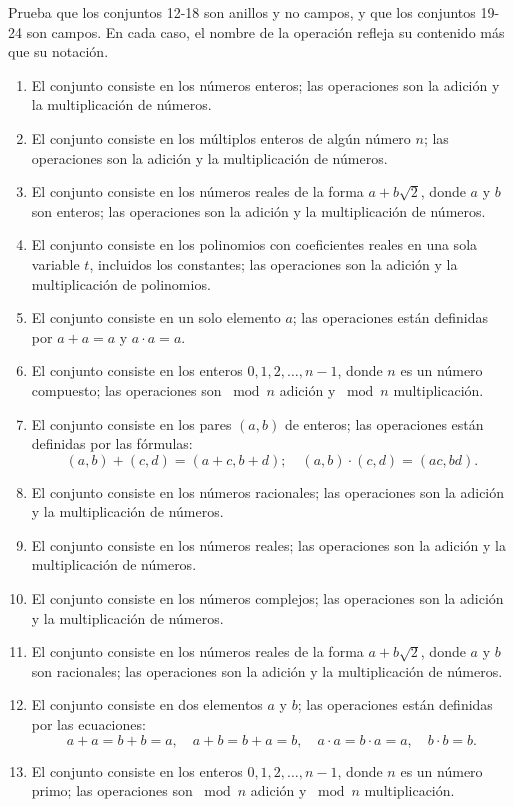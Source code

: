 Prueba que los conjuntos 12-18 son anillos y no campos, y que los conjuntos 19-24 son campos. En cada caso, el nombre de la operación refleja su contenido más que su notación.
\begin{enumerate}[resume]
    \item El conjunto consiste en los números enteros; las operaciones son la adición y la multiplicación de números.
    \item El conjunto consiste en los múltiplos enteros de algún número $n$; las operaciones son la adición y la multiplicación de números.
    \item El conjunto consiste en los números reales de la forma $a + b\sqrt{2}$, donde $a$ y $b$ son enteros; las operaciones son la adición y la multiplicación de números.
    \item El conjunto consiste en los polinomios con coeficientes reales en una sola variable $t$, incluidos los constantes; las operaciones son la adición y la multiplicación de polinomios.
    \item El conjunto consiste en un solo elemento $a$; las operaciones están definidas por $a + a = a$ y $a \cdot a = a$.
    \item El conjunto consiste en los enteros $0, 1, 2, \dots, n - 1$, donde $n$ es un número compuesto; las operaciones son $\bmod n$ adición y $\bmod n$ multiplicación.
    \newpage
    \item El conjunto consiste en los pares $(a, b)$ de enteros; las operaciones están definidas por las fórmulas:
    $$(a, b) + (c, d) = (a + c, b + d); \quad (a, b) \cdot (c, d) = (ac, bd).$$
    \item El conjunto consiste en los números racionales; las operaciones son la adición y la multiplicación de números.
    \item El conjunto consiste en los números reales; las operaciones son la adición y la multiplicación de números.
    \item El conjunto consiste en los números complejos; las operaciones son la adición y la multiplicación de números.
    \item El conjunto consiste en los números reales de la forma $a + b\sqrt{2}$, donde $a$ y $b$ son racionales; las operaciones son la adición y la multiplicación de números.
    \item El conjunto consiste en dos elementos $a$ y $b$; las operaciones están definidas por las ecuaciones:
    $$a + a = b + b = a, \quad a + b = b + a = b, \quad a \cdot a = b \cdot a = a, \quad b \cdot b = b.$$
    \item El conjunto consiste en los enteros $0, 1, 2, \dots, n - 1$, donde $n$ es un número primo; las operaciones son $\bmod n$ adición y $\bmod n$ multiplicación.
\end{enumerate}